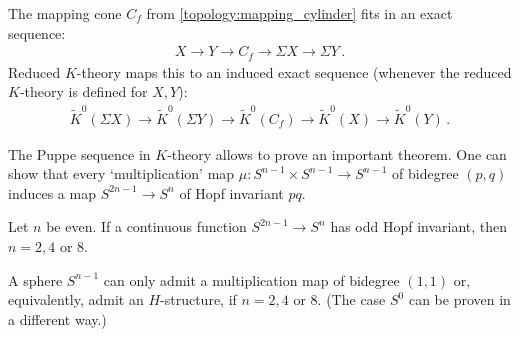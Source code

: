     \begin{property}
        The mapping cone $C_f$ from \cref{topology:mapping_cylinder} fits in an exact sequence:
        \begin{gather}
            X\longrightarrow Y\longrightarrow C_f\longrightarrow\Sigma X\longrightarrow\Sigma Y\,.
        \end{gather}
        Reduced $K$-theory maps this to an induced exact sequence (whenever the reduced $K$-theory is defined for $X,Y$):
        \begin{gather}
            \widetilde{K}^0(\Sigma X)\longrightarrow\widetilde{K}^0(\Sigma Y)\longrightarrow \widetilde{K}^0(C_f)\longrightarrow\widetilde{K}^0(X)\longrightarrow\widetilde{K}^0(Y)\,.
        \end{gather}
    \end{property}
    The Puppe sequence in $K$-theory allows to prove an important theorem.
     One can show that every `multiplication' map $\mu:S^{n-1}\times S^{n-1}\rightarrow S^{n-1}$ of bidegree $(p,q)$ induces a map $S^{2n-1}\rightarrow S^n$ of Hopf invariant $pq$.

     \begin{theorem}
         Let $n$ be even. If a continuous function $S^{2n-1}\rightarrow S^n$ has odd Hopf invariant, then $n=2,4$ or 8.
     \end{theorem}
     \begin{result}
         A sphere $S^{n-1}$ can only admit a multiplication map of bidegree $(1,1)$ or, equivalently, admit an $H$-structure, if $n=2,4$ or 8. (The case $S^0$ can be proven in a different way.)
     \end{result}

